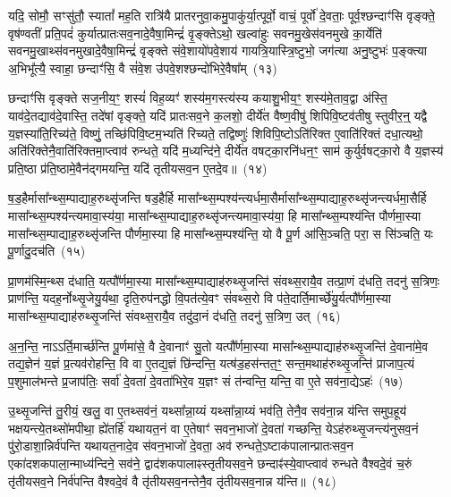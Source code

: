 {\anuvakamend[{आ॒दि॒त्यस्तस्यै॒व द्वे च॑}]}

यदि॒ सोमौ॒ सꣳसु॑तौ॒ स्यातां᳚ मह॒ति रात्रि॑यै प्रातरनुवा॒कमु॒पाकु॑र्या॒त्पूर्वो॒ वाचं॒ पूर्वो॑ दे॒वताः॒ पूर्व॒श्छन्दाꣳ॑सि वृङ्क्ते॒ वृष॑ण्वतीं प्रति॒पदं॑ कुर्यात्प्रातःसव॒नादे॒वैषा॒मिन्द्रं॑ वृ॒ङ्क्ते\-ऽथो॒ खल्वा॑हुः सवनमु॒खेस॑वनमुखे का॒र्येति॑ सवनमु॒खाथ्स॑वनमुखादे॒वैषा॒मिन्द्रं॑ वृङ्क्ते संवे॒शायो॑पवे॒शाय॑ गायत्रि॒यास्त्रि॒ष्टुभो॒ जग॑त्या अनु॒ष्टुभः॑ प॒ङ्क्त्या अ॒भिभू᳚त्यै॒ स्वाहा॒ छन्दाꣳ॑सि॒ वै सं॑वे॒श उ॑पवे॒शश्छन्दो॑भिरे॒वैषा᳚म्~(१३)\ip

छन्दाꣳ॑सि वृङ्क्ते सज॒नीय॒ꣳ॒ शस्यं॑ विह॒व्यꣳ॑ शस्य॑म॒गस्त्य॑स्य कयाशु॒भीय॒ꣳ॒ शस्य॑मे॒ताव॒द्वा अ॑स्ति॒ याव॑दे॒तद्याव॑दे॒वास्ति॒ तदे॑षां वृङ्क्ते॒ यदि॑ प्रातःसव॒ने क॒लशो॒ दीर्ये॑त वैष्ण॒वीषु॑ शिपिवि॒ष्टव॑तीषु स्तुवीर॒न्॒ यद्वै य॒ज्ञस्या॑ति॒रिच्य॑ते॒ विष्णुं॒ तच्छि॑पिवि॒ष्टम॒भ्यति॑ रिच्यते॒ तद्विष्णुः॑ शिविपि॒ष्टो\-ऽति॑रिक्त ए॒वाति॑रिक्तं दधा॒त्यथो॒ अति॑रिक्तेनै॒वाति॑रिक्तमा॒प्त्वाव॑ रुन्धते॒ यदि॑ म॒ध्यन्दि॑ने॒ दीर्ये॑त वषट्का॒रनि॑धन॒ꣳ॒ साम॑ कुर्युर्वषट्का॒रो वै य॒ज्ञस्य॑ प्रति॒ष्ठा प्र॑ति॒ष्ठामे॒वैन॑द्गमयन्ति॒ यदि॑ तृतीय\-सव॒न ए॒तदे॒व॥~(१४)\ip


{\anuvakamend[{छन्दो॑भिरे॒वैषा॒मवैका॒न्नविꣳ॑श॒तिश्च॑}]}

ष॒ड॒हैर्मासा᳚न्थ्स॒म्पाद्याह॒रुथ्सृ॑जन्ति षड॒हैर्\mbox{}हि मासा᳚न्थ्स॒म्पश्य॑न्त्यर्धमा॒सैर्मासा᳚न्थ्स॒म्पाद्याह॒रुथ्सृ॑जन्त्यर्धमा॒सैर्\mbox{}हि मासा᳚न्थ्स॒म्पश्य॑न्त्यमावा॒स्य॑या॒ मासा᳚न्थ्स॒म्पाद्याह॒रुथ्सृ॑जन्त्यमावा॒स्य॑या॒ हि मासा᳚न्थ्स॒म्पश्य॑न्ति पौर्णमा॒स्या मासा᳚न्थ्स॒म्पाद्याह॒रुथ्सृ॑जन्ति पौर्णमा॒स्या हि मासा᳚न्थ्स॒म्पश्य॑न्ति॒ यो वै पू॒र्ण आ॑सि॒ञ्चति॒ परा॒ स सि॑ञ्चति॒ यः पू॒र्णादु॒दच॑ति~(१५)\ip

प्रा॒णम॑स्मि॒न्थ्स द॑धाति॒ यत्पौ᳚र्णमा॒स्या मासा᳚न्थ्स॒म्पाद्याह॑रुथ्सृ॒जन्ति॑ संवथ्स॒रायै॒व तत्प्रा॒णं द॑धति॒ तदनु॑ स॒त्रिणः॒ प्राण॑न्ति॒ यदह॒र्नोथ्सृ॒जेयु॒र्यथा॒ दृति॒रुप॑नद्धो वि॒पत॑त्ये॒वꣳ सं॑वथ्स॒रो वि प॑ते॒दार्ति॒मार्च्छे॑यु॒र्यत्पौ᳚र्णमा॒स्या मासा᳚न्थ्स॒म्पाद्याह॑रुथ्सृ॒जन्ति॑ संवथ्स॒रायै॒व तदु॑दा॒नं द॑धति॒ तदनु॑ स॒त्रिण॒ उत्~(१६)\ip

अ॒न॒न्ति॒ नाऽऽर्ति॒मार्च्छ॑न्ति पू॒र्णमा॑से॒ वै दे॒वानाꣳ॑ सु॒तो यत्पौ᳚र्णमा॒स्या मासा᳚न्थ्स॒म्पाद्याह॑रुथ्सृ॒जन्ति॑ दे॒वाना॑मे॒व तद्य॒ज्ञेन॑ य॒ज्ञं प्र॒त्यव॑रोहन्ति॒ वि वा ए॒तद्य॒ज्ञं छि॑न्दन्ति॒ यत्ष॑ड॒हस॑न्तत॒ꣳ॒ सन्त॒मथाह॑रुथ्सृ॒जन्ति॑ प्राजाप॒त्यं प॒शुमाल॑भन्ते प्र॒जा\-प॑तिः॒ सर्वा॑ दे॒वता॑ दे॒वता॑भिरे॒व य॒ज्ञꣳ सं त॑न्वन्ति॒ यन्ति॒ वा ए॒ते सव॑ना॒द्ये\-ऽहः॑~(१७)\ip

उ॒थ्सृ॒जन्ति॑ तु॒रीयं॒ खलु॒ वा ए॒तथ्सव॑नं॒ यथ्सा᳚न्ना॒य्यं यथ्सा᳚न्ना॒य्यं भव॑ति॒ तेनै॒व सव॑ना॒न्न य॑न्ति समुप॒हूय॑ भक्षयन्त्ये॒तथ्सो॑मपीथा॒ ह्ये॑तर्\mbox{}हि॑ यथायत॒नं वा ए॒तेषाꣳ॑ सवन॒भाजो॑ दे॒वता॑ गच्छन्ति॒ ये\-ऽह॑रुथ्सृ॒जन्त्य॑नुसव॒नं पु॑रो॒डाशा॒न्निर्व॑पन्ति यथायत॒नादे॒व स॑वन॒भाजो॑ दे॒वता॒ अव॑ रुन्धते॒\-ऽष्टाक॑पालान्प्रातःसव॒न एका॑\-दश\-कपाला॒\-न्माध्य॑न्दिने॒ सव॑ने॒ द्वाद॑श\-कपालाꣴस्तृतीय\-सव॒ने छन्दाꣴ॑स्ये॒वाप्त्वाव॑ रुन्धते वैश्वदे॒वं च॒रुं तृ॑तीय\-सव॒ने निर्व॑पन्ति वैश्वदे॒वं वै तृ॑तीय\-सव॒नन्तेनै॒व तृ॑तीय\-सव॒नान्न य॑न्ति॥~(१८)\ip

